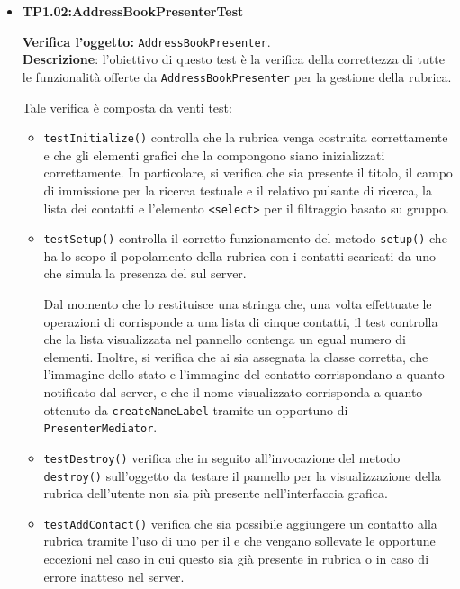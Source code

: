 \begin{itemize}
\item[\passed] \textbf{TP1.02:AddressBookPresenterTest}

\textbf{Verifica l'oggetto:} \texttt{AddressBookPresenter}.\\
\textbf{Descrizione}: l'obiettivo di questo test è la verifica della correttezza di tutte le funzionalità offerte da \texttt{AddressBookPresenter} per la gestione della rubrica.

Tale verifica è composta da venti test:
\begin{itemize}
\item \texttt{testInitialize()} controlla che la rubrica venga costruita correttamente e che gli elementi grafici che la compongono siano inizializzati correttamente. In particolare, si verifica che sia presente il titolo, il campo di immissione per la ricerca testuale e il relativo pulsante di ricerca, la lista dei contatti e l'elemento \verb'<select>' per il filtraggio basato su gruppo.

\item \texttt{testSetup()} controlla il corretto funzionamento del metodo \verb'setup()' che ha lo scopo il popolamento della rubrica con i contatti scaricati da uno  che simula la presenza del  sul server.

Dal momento che lo  restituisce una stringa che, una volta effettuate le operazioni di  corrisponde a una lista di cinque contatti, il test controlla che la lista visualizzata nel pannello contenga un egual numero di elementi. Inoltre, si verifica che ai  sia assegnata la classe corretta, che l'immagine dello stato e l'immagine del contatto corrispondano a quanto notificato dal server, e che il nome visualizzato corrisponda a quanto ottenuto da \verb'createNameLabel' tramite un opportuno  di \texttt{PresenterMediator}.

\item \texttt{testDestroy()} verifica che in seguito all'invocazione del metodo \verb'destroy()' sull'oggetto da testare il pannello per la visualizzazione della rubrica dell'utente non sia più presente nell'interfaccia grafica.

\item \texttt{testAddContact()} verifica che sia possibile aggiungere un contatto alla rubrica tramite l'uso di uno  per il  e che vengano sollevate le opportune eccezioni nel caso in cui questo sia già presente in rubrica o in caso di errore inatteso nel server.


\end{itemize}
\end{itemize}
